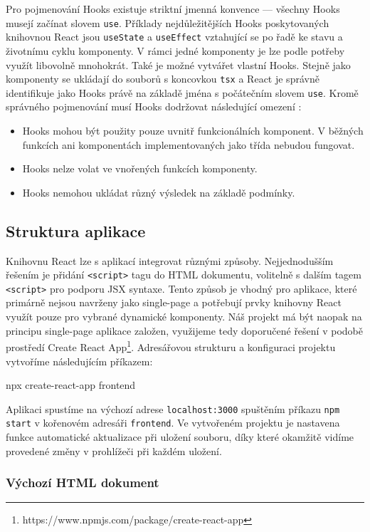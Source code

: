 Pro pojmenování Hooks existuje striktní jmenná konvence --- všechny Hooks musejí začínat slovem \texttt{use}. Příklady nejdůležitějších Hooks poskytovaných knihovnou React jsou \texttt{useState} a \texttt{useEffect} vztahující se po řadě ke stavu a životnímu cyklu komponenty. V rámci jedné komponenty je lze podle potřeby využít libovolně mnohokrát. Také je možné vytvářet vlastní Hooks. Stejně jako komponenty se ukládají do souborů s koncovkou \texttt{tsx} a React je správně identifikuje jako Hooks právě na základě jména s počátečním slovem \texttt{use}. Kromě správného pojmenování musí Hooks dodržovat následující omezení \citep{react-hooks-w3c}:
\begin{itemize}
    \item Hooks mohou být použity pouze uvnitř funkcionálních komponent. V běžných funkcích ani komponentách implementovaných jako třída nebudou fungovat.
    \item Hooks nelze volat ve vnořených funkcích komponenty.
    \item Hooks nemohou ukládat různý výsledek na základě podmínky.
\end{itemize}
 
\subsection{Struktura aplikace}

Knihovnu React lze s aplikací integrovat různými způsoby. Nejjednodušším řešením je přidání \texttt{<script>} tagu do HTML dokumentu, volitelně s dalším tagem \texttt{<script>} pro podporu JSX syntaxe. Tento způsob je vhodný pro aplikace, které primárně nejsou navrženy jako single-page a potřebují prvky knihovny React využít pouze pro vybrané dynamické komponenty. Náš projekt má být naopak na principu single-page aplikace založen, využijeme tedy doporučené řešení v podobě prostředí Create React App\footnote{https://www.npmjs.com/package/create-react-app}. Adresářovou strukturu a konfiguraci projektu vytvoříme následujícím příkazem:
\begin{code}
npx create-react-app frontend
\end{code}
Aplikaci spustíme na výchozí adrese \texttt{localhost:3000} spuštěním příkazu \texttt{npm start} v kořenovém adresáři \texttt{frontend}. Ve vytvořeném projektu je nastavena funkce automatické aktualizace při uložení souboru, díky které okamžitě vidíme provedené změny v prohlížeči při každém uložení.

\subsubsection{Výchozí HTML dokument}

